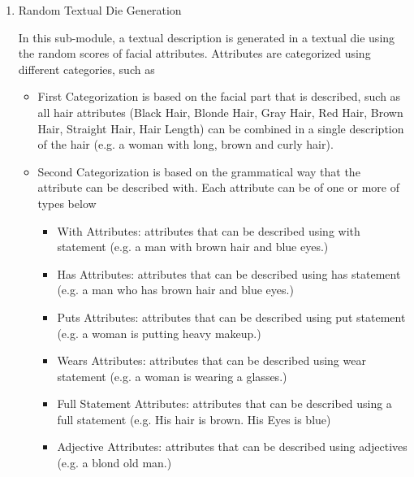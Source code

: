 \begin{enumerate}
    
    \item Random Textual Die Generation
    
    In this sub-module, a textual description is generated in a textual die using the random scores of facial attributes. Attributes are categorized using different categories, such as
    
    \begin{itemize}
    \item First Categorization is based on the facial part that is described, such as all hair attributes (Black Hair, Blonde Hair, Gray Hair, Red Hair, Brown Hair, Straight Hair, Hair Length) can be combined in a single description of the hair (e.g. a woman with long, brown and curly hair).
    \item Second Categorization is based on the grammatical way that the attribute can be described with. Each attribute can be of one or more of types below
        \begin{itemize}
            \item With Attributes: attributes that can be described using with statement (e.g. a man with brown hair and blue eyes.)
            \item Has Attributes: attributes that can be described using has statement (e.g. a man who has brown hair and blue eyes.)
            \item Puts Attributes: attributes that can be described using put statement (e.g. a woman is putting heavy makeup.)
            \item Wears Attributes: attributes that can be described using wear statement (e.g. a woman is wearing a glasses.)
            \item Full Statement Attributes: attributes that can be described using a full statement (e.g. His hair is brown. His Eyes is blue)
            \item Adjective Attributes: attributes that can be described using adjectives (e.g. a blond old man.)
        \end{itemize}    
    \end{itemize}
    

\end{enumerate}
